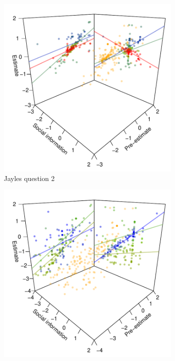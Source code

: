 \documentclass[9pt,twoside,lineno]{pnas-new}
\begin{document}
\begin{figure}[htbp]
\begin{subfigure}[b]{.24\textwidth}
		\includegraphics[width=\textwidth]{../plots/jayles2_vs_xp3d.pdf}
		\caption{Jayles question 2}
	\end{subfigure}
		\begin{subfigure}[b]{.24\textwidth}
		\includegraphics[width=\textwidth]{../plots/jayles8_vs_xp3d.pdf}

\end{subfigure}
\end{figure}
\end{document}
